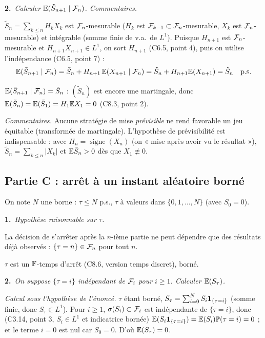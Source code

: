 \documentclass[11pt,a4paper]{article}
\newcommand{\question}[2]{\par\medskip\noindent\textbf{#1}~\textit{#2}\par\smallskip}
\begin{document}
\begin{exo}
\question{2.}{Calculer $\mathbb{E}(\tilde S_{n+1}\mid\mathcal{F}_n)$. Commentaires.}
$\tilde S_n=\sum_{k\le n}H_kX_k$ est $\mathcal{F}_n$-mesurable ($H_k$ est $\mathcal{F}_{k-1}\subset\mathcal{F}_n$-mesurable, $X_k$ est $\mathcal{F}_n$-mesurable) et
intégrable (somme finie de v.a.\ de $L^1$). Puisque $H_{n+1}$ est $\mathcal{F}_n$-mesurable et $H_{n+1}X_{n+1}\in L^1$, on sort $H_{n+1}$ (C6.5, point 4),
puis on utilise l'indépendance (C6.5, point 7) :
\[\mathbb{E}(\tilde S_{n+1}\mid\mathcal{F}_n)=\tilde S_n+H_{n+1}\,\mathbb{E}(X_{n+1}\mid\mathcal{F}_n)=\tilde S_n+H_{n+1}\mathbb{E}(X_{n+1})=\tilde S_n\quad\text{p.s.}\]
\begin{resultat}$\mathbb{E}(\tilde S_{n+1}\mid\mathcal{F}_n)=\tilde S_n$ : $(\tilde S_n)$ est encore une martingale, donc $\mathbb{E}(\tilde S_n)=\mathbb{E}(\tilde S_1)=H_1\mathbb{E} X_1=0$ (C8.3, point 2).\end{resultat}
\textit{Commentaires.} Aucune stratégie de mise \emph{prévisible} ne rend favorable un jeu équitable (transformée de martingale).
L'hypothèse de prévisibilité est indispensable : avec $H_n=\operatorname{signe}(X_n)$ (on « mise après avoir vu le résultat »),
$\tilde S_n=\sum_{k\le n}|X_k|$ et $\mathbb{E}\tilde S_n>0$ dès que $X_1\not\equiv0$.

\subsection*{Partie C : arrêt à un instant aléatoire borné}
On note $N$ une borne : $\tau\le N$ p.s., $\tau$ à valeurs dans $\{0,1,\dots,N\}$ (avec $S_0=0$).

\question{1.}{Hypothèse raisonnable sur $\tau$.}
La décision de s'arrêter après la $n$-ième partie ne peut dépendre que des résultats déjà observés : $\{\tau=n\}\in\mathcal{F}_n$ pour tout $n$.
\begin{resultat}$\tau$ est un $\mathbb{F}$-temps d'arrêt (C8.6, version temps discret), borné.\end{resultat}

\question{2.}{On suppose $\{\tau=i\}$ indépendant de $\mathcal{F}_i$ pour $i\ge1$. Calculer $\mathbb{E}(S_\tau)$.}
\emph{Calcul sous l'hypothèse de l'énoncé.} $\tau$ étant borné, $S_\tau=\sum_{i=0}^NS_i\mathbf{1}_{\{\tau=i\}}$ (somme finie, donc $S_\tau\in L^1$).
Pour $i\ge1$, $\sigma(S_i)\subset\mathcal{F}_i$ est indépendante de $\{\tau=i\}$, donc (C3.14, point 3, $S_i\in L^1$ et indicatrice bornée)
$\mathbb{E}(S_i\mathbf{1}_{\{\tau=i\}})=\mathbb{E}(S_i)\mathbb{P}(\tau=i)=0$ ; et le terme $i=0$ est nul car $S_0=0$. D'où $\mathbb{E}(S_\tau)=0$.


\end{exo}
\end{document}
